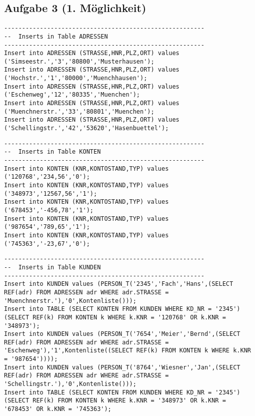 \documentclass{scrartcl}
\begin{document}
\begin{landscape}
\section*{Aufgabe 3 (1. Möglichkeit)}
\begin{lstlisting}
--------------------------------------------------------
--  Inserts in Table ADRESSEN
--------------------------------------------------------
Insert into ADRESSEN (STRASSE,HNR,PLZ,ORT) values ('Simseestr.','3','80800','Musterhausen');
Insert into ADRESSEN (STRASSE,HNR,PLZ,ORT) values ('Hochstr.','1','80000','Muenchhausen');
Insert into ADRESSEN (STRASSE,HNR,PLZ,ORT) values ('Eschenweg','12','80335','Muenchen');
Insert into ADRESSEN (STRASSE,HNR,PLZ,ORT) values ('Muenchnerstr.','33','80801','Muenchen');
Insert into ADRESSEN (STRASSE,HNR,PLZ,ORT) values ('Schellingstr.','42','53620','Hasenbuettel');
\end{lstlisting}
\begin{lstlisting}
--------------------------------------------------------
--  Inserts in Table KONTEN
--------------------------------------------------------
Insert into KONTEN (KNR,KONTOSTAND,TYP) values ('120768','234,56','0');
Insert into KONTEN (KNR,KONTOSTAND,TYP) values ('348973','12567,56','1');
Insert into KONTEN (KNR,KONTOSTAND,TYP) values ('678453','-456,78','1');
Insert into KONTEN (KNR,KONTOSTAND,TYP) values ('987654','789,65','1');
Insert into KONTEN (KNR,KONTOSTAND,TYP) values ('745363','-23,67','0');
\end{lstlisting}
\begin{lstlisting}
--------------------------------------------------------
--  Inserts in Table KUNDEN
--------------------------------------------------------
Insert into KUNDEN values (PERSON_T('2345','Fach','Hans',(SELECT REF(adr) FROM ADRESSEN adr WHERE adr.STRASSE = 'Muenchnerstr.'),'0',Kontenliste()));
Insert into TABLE (SELECT KONTEN FROM KUNDEN WHERE KD_NR = '2345')(SELECT REF(k) FROM KONTEN k WHERE k.KNR = '120768' OR k.KNR = '348973');
Insert into KUNDEN values (PERSON_T('7654','Meier','Bernd',(SELECT REF(adr) FROM ADRESSEN adr WHERE adr.STRASSE = 'Eschenweg'),'1',Kontenliste((SELECT REF(k) FROM KONTEN k WHERE k.KNR = '987654'))));
Insert into KUNDEN values (PERSON_T('8764','Wiesner','Jan',(SELECT REF(adr) FROM ADRESSEN adr WHERE adr.STRASSE = 'Schellingstr.'),'0',Kontenliste()));
Insert into TABLE (SELECT KONTEN FROM KUNDEN WHERE KD_NR = '2345')(SELECT REF(k) FROM KONTEN k WHERE k.KNR = '348973' OR k.KNR = '678453' OR k.KNR = '745363');

\end{lstlisting}
\end{landscape}
\end{document}
